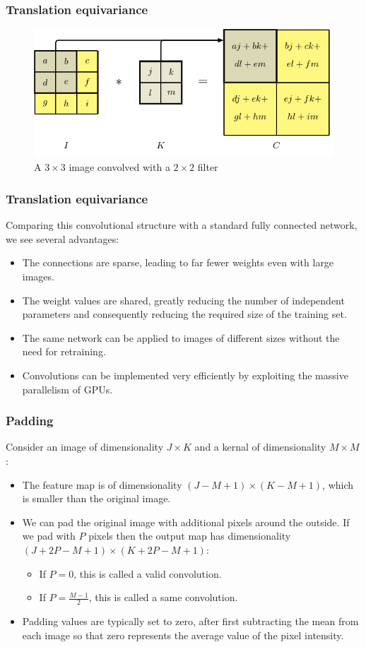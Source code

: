\documentclass{beamer}
\begin{document}
\begin{frame}
    \frametitle{Translation equivariance}
    \begin{figure}
        \caption{A $3\times{}3$ image convolved with a $2\times{}2$ filter}
        \includegraphics{Figure_3.pdf}
    \end{figure}
\end{frame}

\begin{frame}
    \frametitle{Translation equivariance}
    Comparing this convolutional structure with a standard fully connected network, we see several advantages:
    \begin{itemize}
        \item The connections are sparse, leading to far fewer weights even with large images.
        \item The weight values are shared, greatly reducing the number of independent parameters and consequently reducing the required size of the training set.
        \item The same network can be applied to images of different sizes without the need for retraining.
        \item Convolutions can be implemented very efficiently by exploiting the massive parallelism of GPUs.
    \end{itemize}
\end{frame}

\begin{frame}
    \frametitle{Padding}
    Consider an image of dimensionality $J\times{}K$ and a kernal of dimensionality $M\times{}M$:
    \begin{itemize}
        \item The feature map is of dimensionality $(J-M+1)\times(K-M+1)$, which is smaller than the original image.
        \item We can pad the original image with additional pixels around the outside. If we pad with $P$ pixels then the output map has dimensionality $(J+2P-M+1)\times(K+2P-M+1)$:
        \begin{itemize}
            \item If $P=0$, this is called a valid convolution.
            \item If $P=\frac{M-1}{2}$, this is called a same convolution.
        \end{itemize}
        \item Padding values are typically set to zero, after first subtracting the mean from each image so that zero represents the average value of the pixel intensity.
    \end{itemize}
\end{frame}
\end{document}
